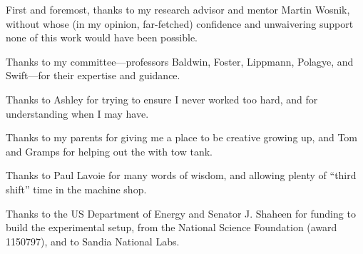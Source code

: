 



\begin{Acknowledgments}
\setlength{\baselineskip}{1.5\baselineskip} 
{ 
    
    First and foremost, thanks to my research advisor and mentor Martin Wosnik,
    without whose (in my opinion, far-fetched) confidence and unwaivering
    support none of this work would have been possible.
    
    Thanks to my committee---professors Baldwin, Foster, Lippmann, Polagye, and
    Swift---for their expertise and guidance.
    
    Thanks to Ashley for trying to ensure I never worked too hard, and for
    understanding when I may have.
    
    Thanks to my parents for giving me a place to be creative growing up, and
    Tom and Gramps for helping out the with tow tank.
    
    Thanks to Paul Lavoie for many words of wisdom, and allowing plenty of
    ``third shift'' time in the machine shop.
    
    Thanks to the US Department of Energy and Senator J. Shaheen for funding to
    build the experimental setup, from the National Science Foundation (award
    1150797), and to Sandia National Labs.
    

}
\end{Acknowledgments}
